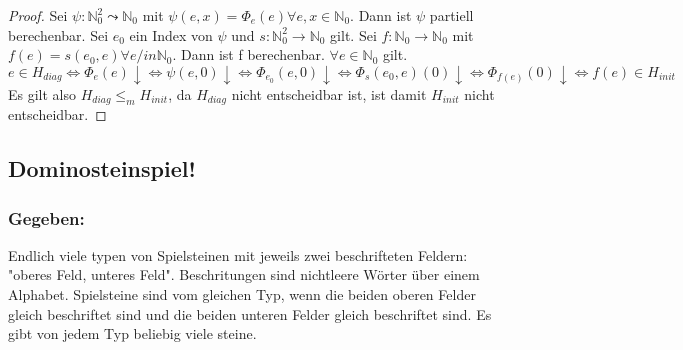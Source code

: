 \begin{proof}
  Sei $\psi : \mathbb{N}_0^2 \leadsto \mathbb{N}_0$ mit $\psi (e, x) = \Phi_e(e) \forall e, x \in \mathbb{N}_0$. Dann ist $\psi$ partiell berechenbar. Sei $e_0$ ein Index von $\psi$ und $s:\mathbb{N}_0^2 \to \mathbb{N}_0$ gilt. Sei $f: \mathbb{N}_0 \to \mathbb{N}_0$ mit $f(e) = s(e_0, e) \forall e /in \mathbb{N}_0$. Dann ist f berechenbar. $\forall e \in \mathbb{N}_0$ gilt. \[e \in H_{diag} \Leftrightarrow \Phi_e(e) \downarrow \Leftrightarrow \psi(e, 0) \downarrow \Leftrightarrow \Phi_{e_0}(e, 0) \downarrow \Leftrightarrow \Phi_s (e_0, e)(0)\downarrow \Leftrightarrow \Phi_{f(e)} (0)\downarrow \Leftrightarrow f(e) \in H_{init}\] Es gilt also $H_{diag} \leq_{m} H_{init}$, da $H_{diag}$ nicht entscheidbar ist, ist damit $H_{init}$ nicht entscheidbar.
\end{proof}

\subsection*{Dominosteinspiel!}
\subsubsection*{Gegeben: } Endlich viele typen von Spielsteinen mit jeweils zwei beschrifteten Feldern: "oberes Feld, unteres Feld". Beschritungen sind nichtleere Wörter über einem Alphabet. Spielsteine sind vom gleichen Typ, wenn die beiden oberen Felder gleich beschriftet sind und die beiden unteren Felder gleich beschriftet sind. Es gibt von jedem Typ beliebig viele steine. 

